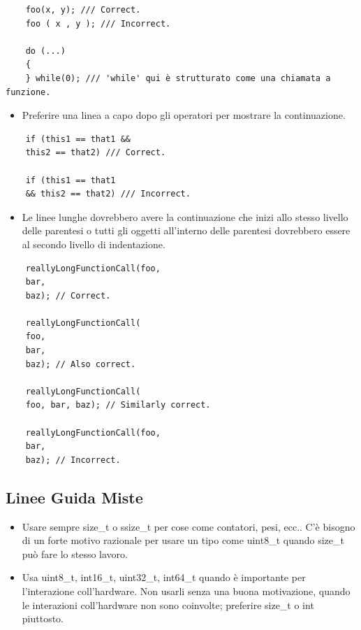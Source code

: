 \begin{lstlisting}
	foo(x, y); /// Correct.
	foo ( x , y ); /// Incorrect.
	
	do (...)
	{
	} while(0); /// 'while' qui è strutturato come una chiamata a funzione.
\end{lstlisting}

\begin{itemize}
	\item \textsf{\small Preferire una linea a capo dopo gli operatori per mostrare la continuazione.}
\end{itemize}

\begin{lstlisting}
	if (this1 == that1 &&
	this2 == that2) /// Correct.
	
	if (this1 == that1
	&& this2 == that2) /// Incorrect.
\end{lstlisting}

\begin{itemize}
	\item \textsf{\small Le linee lunghe dovrebbero avere la continuazione che inizi allo stesso livello delle parentesi o tutti gli oggetti all'interno delle parentesi dovrebbero essere al secondo livello di indentazione.}
\end{itemize}

\begin{lstlisting}
	reallyLongFunctionCall(foo,
	bar,
	baz); // Correct.
	
	reallyLongFunctionCall(
	foo,
	bar,
	baz); // Also correct.
	
	reallyLongFunctionCall(
	foo, bar, baz); // Similarly correct.
	
	reallyLongFunctionCall(foo,
	bar,
	baz); // Incorrect.
\end{lstlisting}

\subsection{Linee Guida Miste}

\begin{itemize}
	\item \textsf{\small  Usare sempre size\_t o ssize\_t per cose come contatori, pesi, ecc.. C'è bisogno di un forte motivo razionale per usare un tipo come uint8\_t quando size\_t può fare lo stesso lavoro.}
	\item \textsf{\small Usa uint8\_t, int16\_t, uint32\_t, int64\_t quando è importante per l'interazione coll'hardware. Non usarli senza una buona motivazione, quando le interazioni coll'hardware non sono coinvolte; preferire size\_t o int piuttosto.}
\end{itemize}

